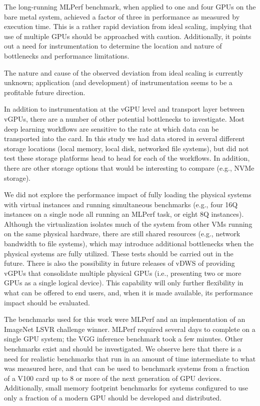 \documentclass[acmsmall, authorversion]{acmart}
\begin{document}
The long-running MLPerf benchmark, when applied to one and four GPUs on the bare metal system, achieved a factor of three in performance as measured by execution time.
This is a rather rapid deviation from ideal scaling, implying that use of multiple GPUs should be approached with caution. Additionally, it points out a need for instrumentation to determine the location and nature of bottlenecks and performance limitations.

The nature and cause of the observed deviation from ideal scaling is currently unknown; application (and development) of instrumentation seems to be a profitable future direction.

In addition to instrumentation at the vGPU level and transport layer between vGPUs, there are a number of other potential bottlenecks to investigate. Most deep learning workflows are sensitive to the rate at which data can be transported into the card. In this study we had data stored in several different storage locations (local memory, local disk, networked file systems), but did not test these storage platforms head to head for each of the workflows. In addition, there are other storage options that would be interesting to compare (e.g., NVMe storage).

We did not explore the performance impact of fully loading the physical systems with virtual instances and running simultaneous benchmarks (e.g., four 16Q instances on a single node all running an MLPerf task, or eight 8Q instances). Although the virtualization isolates much of the system from other VMs running on the same physical hardware, there are still shared resources (e.g., network bandwidth to file systems), which may introduce additional bottlenecks when the physical systems are fully utilized. These tests should be carried out in the future. There is also the possibility in future releases of vDWS of providing vGPUs that consolidate multiple physical GPUs (i.e., presenting two or more GPUs as a single logical device). This capability will only further flexibility in what can be offered to end users, and, when it is made available, its performance impact should be evaluated.

The benchmarks used for this work were MLPerf and an implementation of an ImageNet LSVR challenge winner. MLPerf required several days to complete on a single GPU system; the VGG inference benchmark took a few minutes. Other benchmarks \cite{bench-design} exist and should be investigated. We observe here that there is a need for realistic benchmarks that run in an amount of time intermediate to what was measured here, and that can be used to benchmark systems from a fraction of a V100 card up to 8 or more of the next generation of GPU devices. Additionally, small memory footprint benchmarks for systems configured to use only a fraction of a modern GPU should be developed and distributed.
\end{document}
